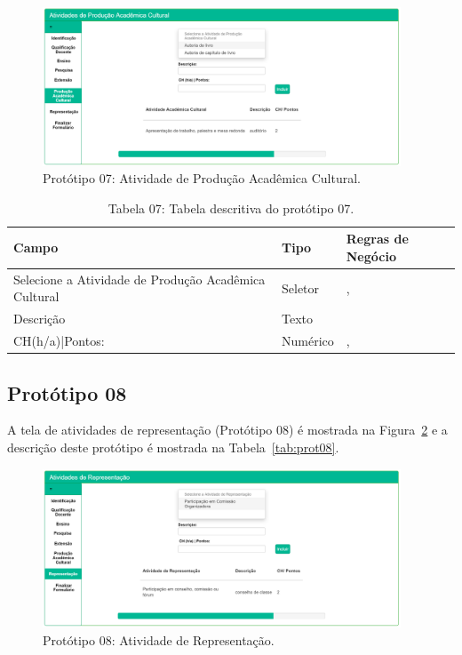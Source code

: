 \begin{figure}[H]
    \centering
    \includegraphics[width=0.95\textwidth]{img/7pagina_de_prod_academica.png}
    \caption[Protótipo 07: Atividade de Produção Acadêmica Cultural]{Protótipo 07: Atividade de Produção Acadêmica Cultural.}
    \label{fig:prot07}
\end{figure}


\begin{table}[H]
\centering
\caption[Tabela 07: Tabela descritiva do protótipo 07.]{Tabela 07: Tabela descritiva do protótipo 07.}
\label{tab:prot07}
\begin{tabular}{@{}lll@{}}
\toprule
Campo                                                & Tipo     &  Regras de Negócio     \\ \midrule
Selecione a Atividade de Produção Acadêmica Cultural & Seletor  &    \nameref{rn010}, \nameref{rn019}\\
Descrição                                            & Texto    &    \nameref{rn010}                 \\
CH(h/a)|Pontos:                                      & Numérico &    \nameref{rn010}, \nameref{rn020}\\ \bottomrule
\end{tabular}
\end{table}

\newpage
\subsection{Protótipo 08}\label{prototipo08}

A tela de atividades de representação (Protótipo 08) é mostrada na Figura~\ref{fig:prot08} e a descrição deste protótipo é mostrada na Tabela~\ref{tab:prot08}.

\begin{figure}[H]
    \centering
    \includegraphics[width=0.95\textwidth]{img/8pagina_representacao.png}
    \caption[Protótipo 08: Atividade de Representação]{Protótipo 08: Atividade de Representação.}
    \label{fig:prot08}
\end{figure}


